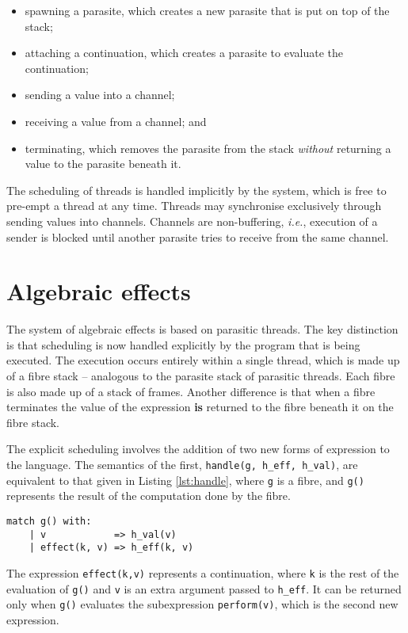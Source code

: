 \documentclass[12pt,a4paper,twoside,openright]{report}
\begin{document}
\begin{itemize}
\item spawning a parasite, which creates a new parasite that is put on top of the stack; 
\item attaching a continuation, which creates a parasite to evaluate the continuation;
\item sending a value into a channel;
\item receiving a value from a channel; and 
\item terminating, which removes the parasite from the stack \textit{without} returning a value to the parasite beneath it.
\end{itemize}

The scheduling of threads is handled implicitly by the system, which is free to pre-empt a thread at any time.  Threads may synchronise exclusively through sending values into channels. Channels are non-buffering, \textit{i.e.}, execution of a sender is blocked until another parasite tries to receive from the same channel.

\section{Algebraic effects}\label{prepalg}

The system of algebraic effects is based on parasitic threads. The key distinction is that scheduling is now handled explicitly by the program that is being executed. The execution occurs entirely within a single thread, which is made up of a fibre stack -- analogous to the parasite stack of parasitic threads. Each fibre is also made up of a stack of frames. Another difference is that when a fibre terminates the value of the expression \textbf{is} returned to the fibre beneath it on the fibre stack.

The explicit scheduling involves the addition of two new forms of expression to the language. The semantics of the first, \texttt{handle(g, h\_eff, h\_val)}, are equivalent to that given in Listing \ref{lst:handle}, where \texttt{g} is a fibre, and \texttt{g()} represents the result of the computation done by the fibre.


\begin{lstlisting}[caption=The semantics of \texttt{handle},label={lst:handle}]
  match g() with:
    | v            => h_val(v)
    | effect(k, v) => h_eff(k, v)
\end{lstlisting}

The expression \texttt{effect(k,v)} represents a continuation, where \texttt{k} is the rest of the evaluation of \texttt{g()} and \texttt{v} is an extra argument passed to \texttt{h\_eff}. It can be returned only when \texttt{g()} evaluates the subexpression \texttt{perform(v)}, which is the second new expression.
\end{document}
